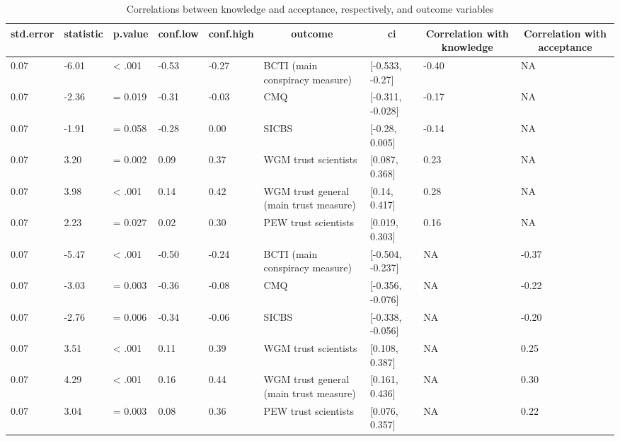 \documentclass[
  doc,floatsintext]{apa6}
\begin{document}
\begin{table}[tbp]

\begin{center}
\begin{threeparttable}

\caption{\label{tab:exp2-correlations-outcomes}Correlations between knowledge and acceptance, respectively, and outcome variables}

\begin{tabular}{lllllllll}
\toprule
std.error & \multicolumn{1}{c}{statistic} & \multicolumn{1}{c}{p.value} & \multicolumn{1}{c}{conf.low} & \multicolumn{1}{c}{conf.high} & \multicolumn{1}{c}{outcome} & \multicolumn{1}{c}{ci} & \multicolumn{1}{c}{Correlation with knowledge} & \multicolumn{1}{c}{Correlation with acceptance}\\
\midrule
0.07 & -6.01 & < .001 & -0.53 & -0.27 & BCTI 
(main conspiracy measure) & {}[-0.533, -0.27] & -0.40 & NA\\
0.07 & -2.36 & = 0.019 & -0.31 & -0.03 & CMQ & {}[-0.311, -0.028] & -0.17 & NA\\
0.07 & -1.91 & = 0.058 & -0.28 & 0.00 & SICBS & {}[-0.28, 0.005] & -0.14 & NA\\
0.07 & 3.20 & = 0.002 & 0.09 & 0.37 & WGM trust scientists & {}[0.087, 0.368] & 0.23 & NA\\
0.07 & 3.98 & < .001 & 0.14 & 0.42 & WGM trust general 
(main trust measure) & {}[0.14, 0.417] & 0.28 & NA\\
0.07 & 2.23 & = 0.027 & 0.02 & 0.30 & PEW trust scientists & {}[0.019, 0.303] & 0.16 & NA\\
0.07 & -5.47 & < .001 & -0.50 & -0.24 & BCTI 
(main conspiracy measure) & {}[-0.504, -0.237] & NA & -0.37\\
0.07 & -3.03 & = 0.003 & -0.36 & -0.08 & CMQ & {}[-0.356, -0.076] & NA & -0.22\\
0.07 & -2.76 & = 0.006 & -0.34 & -0.06 & SICBS & {}[-0.338, -0.056] & NA & -0.20\\
0.07 & 3.51 & < .001 & 0.11 & 0.39 & WGM trust scientists & {}[0.108, 0.387] & NA & 0.25\\
0.07 & 4.29 & < .001 & 0.16 & 0.44 & WGM trust general 
(main trust measure) & {}[0.161, 0.436] & NA & 0.30\\
0.07 & 3.04 & = 0.003 & 0.08 & 0.36 & PEW trust scientists & {}[0.076, 0.357] & NA & 0.22\\
\bottomrule
\end{tabular}

\end{threeparttable}
\end{center}

\end{table}
\end{document}
